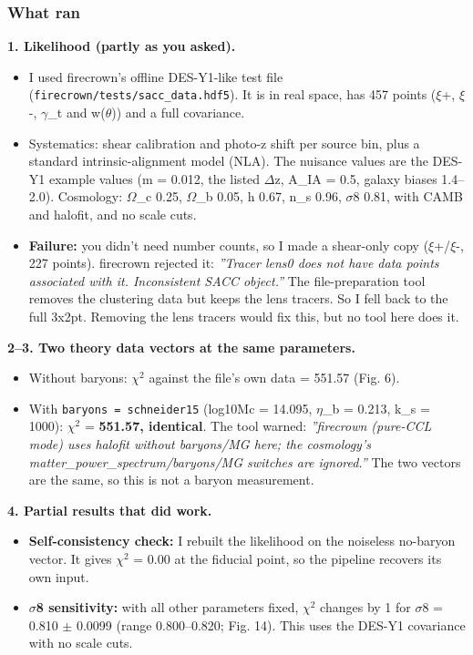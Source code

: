 \documentclass[11pt,a4paper]{article}
\begin{document}
\subsubsection*{What ran}
\textbf{1. Likelihood (partly as you asked).}

\begin{itemize}
  \item I used firecrown's offline DES-Y1-like test file (\texttt{firecrown/\allowbreak{}tests/\allowbreak{}sacc\_\allowbreak{}data.hdf5}). It is in real space, has 457 points ($\xi$+, $\xi$-, $\gamma$\_t and w($\theta$)) and a full covariance.
  \item Systematics: shear calibration and photo-z shift per source bin, plus a standard intrinsic-alignment model (NLA). The nuisance values are the DES-Y1 example values (m = 0.012, the listed $\Delta$z, A\_IA = 0.5, galaxy biases 1.4--2.0). Cosmology: $\Omega$\_c 0.25, $\Omega$\_b 0.05, h 0.67, n\_s 0.96, $\sigma$8 0.81, with CAMB and halofit, and no scale cuts.
  \item \textbf{Failure:} you didn't need number counts, so I made a shear-only copy ($\xi$+/$\xi$-, 227 points). firecrown rejected it: \textit{''Tracer lens0 does not have data points associated with it. Inconsistent SACC object.''} The file-preparation tool removes the clustering data but keeps the lens tracers. So I fell back to the full 3x2pt. Removing the lens tracers would fix this, but no tool here does it.
\end{itemize}
\textbf{2--3. Two theory data vectors at the same parameters.}

\begin{itemize}
  \item Without baryons: $\chi$$^2$ against the file's own data = 551.57 (Fig. 6).
  \item With \texttt{baryons =\allowbreak{} schneider15} (log10Mc = 14.095, $\eta$\_b = 0.213, k\_s = 1000): $\chi$$^2$ = \textbf{551.57, identical}. The tool warned: \textit{''firecrown (pure-CCL mode) uses halofit without baryons/MG here; the cosmology's matter\_power\_spectrum/baryons/MG switches are ignored.''} The two vectors are the same, so this is not a baryon measurement.
\end{itemize}
\textbf{4. Partial results that did work.}

\begin{itemize}
  \item \textbf{Self-consistency check:} I rebuilt the likelihood on the noiseless no-baryon vector. It gives $\chi$$^2$ = 0.00 at the fiducial point, so the pipeline recovers its own input.
  \item \textbf{$\sigma$8 sensitivity:} with all other parameters fixed, $\chi$$^2$ changes by 1 for $\sigma$8 = 0.810 $\pm$ 0.0099 (range 0.800--0.820; Fig. 14). This uses the DES-Y1 covariance with no scale cuts.
\end{itemize}
\end{document}

